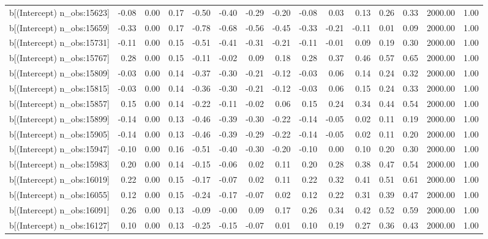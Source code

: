 \begin{table}[ht]
\begin{tabular}{rrrrrrrrrrrrrrr}
  b[(Intercept) n\_obs:15623] & -0.08 & 0.00 & 0.17 & -0.50 & -0.40 & -0.29 & -0.20 & -0.08 & 0.03 & 0.13 & 0.26 & 0.33 & 2000.00 & 1.00 \\ 
  b[(Intercept) n\_obs:15659] & -0.33 & 0.00 & 0.17 & -0.78 & -0.68 & -0.56 & -0.45 & -0.33 & -0.21 & -0.11 & 0.01 & 0.09 & 2000.00 & 1.00 \\ 
  b[(Intercept) n\_obs:15731] & -0.11 & 0.00 & 0.15 & -0.51 & -0.41 & -0.31 & -0.21 & -0.11 & -0.01 & 0.09 & 0.19 & 0.30 & 2000.00 & 1.00 \\ 
  b[(Intercept) n\_obs:15767] & 0.28 & 0.00 & 0.15 & -0.11 & -0.02 & 0.09 & 0.18 & 0.28 & 0.37 & 0.46 & 0.57 & 0.65 & 2000.00 & 1.00 \\ 
  b[(Intercept) n\_obs:15809] & -0.03 & 0.00 & 0.14 & -0.37 & -0.30 & -0.21 & -0.12 & -0.03 & 0.06 & 0.14 & 0.24 & 0.32 & 2000.00 & 1.00 \\ 
  b[(Intercept) n\_obs:15815] & -0.03 & 0.00 & 0.14 & -0.36 & -0.30 & -0.21 & -0.12 & -0.03 & 0.06 & 0.15 & 0.24 & 0.33 & 2000.00 & 1.00 \\ 
  b[(Intercept) n\_obs:15857] & 0.15 & 0.00 & 0.14 & -0.22 & -0.11 & -0.02 & 0.06 & 0.15 & 0.24 & 0.34 & 0.44 & 0.54 & 2000.00 & 1.00 \\ 
  b[(Intercept) n\_obs:15899] & -0.14 & 0.00 & 0.13 & -0.46 & -0.39 & -0.30 & -0.22 & -0.14 & -0.05 & 0.02 & 0.11 & 0.19 & 2000.00 & 1.00 \\ 
  b[(Intercept) n\_obs:15905] & -0.14 & 0.00 & 0.13 & -0.46 & -0.39 & -0.29 & -0.22 & -0.14 & -0.05 & 0.02 & 0.11 & 0.20 & 2000.00 & 1.00 \\ 
  b[(Intercept) n\_obs:15947] & -0.10 & 0.00 & 0.16 & -0.51 & -0.40 & -0.30 & -0.20 & -0.10 & 0.00 & 0.10 & 0.20 & 0.30 & 2000.00 & 1.00 \\ 
  b[(Intercept) n\_obs:15983] & 0.20 & 0.00 & 0.14 & -0.15 & -0.06 & 0.02 & 0.11 & 0.20 & 0.28 & 0.38 & 0.47 & 0.54 & 2000.00 & 1.00 \\ 
  b[(Intercept) n\_obs:16019] & 0.22 & 0.00 & 0.15 & -0.17 & -0.07 & 0.02 & 0.11 & 0.22 & 0.32 & 0.41 & 0.51 & 0.61 & 2000.00 & 1.00 \\ 
  b[(Intercept) n\_obs:16055] & 0.12 & 0.00 & 0.15 & -0.24 & -0.17 & -0.07 & 0.02 & 0.12 & 0.22 & 0.31 & 0.39 & 0.47 & 2000.00 & 1.00 \\ 
  b[(Intercept) n\_obs:16091] & 0.26 & 0.00 & 0.13 & -0.09 & -0.00 & 0.09 & 0.17 & 0.26 & 0.34 & 0.42 & 0.52 & 0.59 & 2000.00 & 1.00 \\ 
  b[(Intercept) n\_obs:16127] & 0.10 & 0.00 & 0.13 & -0.25 & -0.15 & -0.07 & 0.01 & 0.10 & 0.19 & 0.27 & 0.36 & 0.43 & 2000.00 & 1.00 \\ 

\end{tabular}
\end{table}
